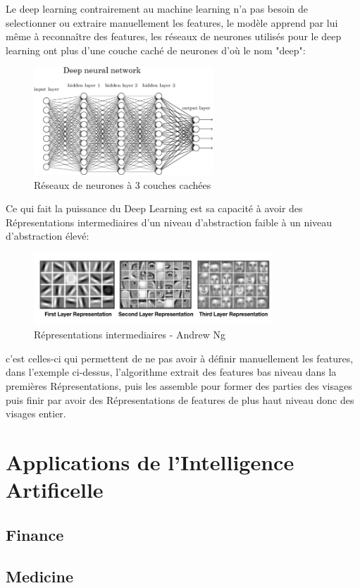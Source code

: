 Le deep learning contrairement au machine learning n'a pas besoin de selectionner 
ou extraire manuellement les features, le modèle apprend par lui même à reconnaître 
des features, les réseaux de neurones utilisés pour le deep learning 
ont plus d'une couche caché de neurones d'où le nom "deep": \newline

\begin{figure}[!h]
    \centering
    \includegraphics[width=0.6\textwidth]{Images/deepnn}
    \caption{Réseaux de neurones à 3 couches cachées}
	\label{fig:deepneuralnetwork}
\end{figure}

Ce qui fait la puissance du Deep Learning est sa capacité à avoir des Répresentations
intermediaires d'un niveau d'abstraction faible à un niveau d'abstraction élevé:

\begin{figure}[!h]
    \centering
    \includegraphics[width=0.8\textwidth]{Images/layeredrepresentation}
    \caption{Répresentations intermediaires - Andrew Ng}
	\label{fig:deepnnrepresentation}
\end{figure}

c'est celles-ci qui permettent de ne pas avoir à définir manuellement les features, 
dans l'exemple ci-dessus, l'algorithme extrait des features bas niveau dans la 
premières Répresentations, puis les assemble pour former des parties des 
visages puis finir par avoir des Répresentations de features de plus 
haut niveau donc des visages entier. \newline


\chapter{Applications de l'Intelligence Artificelle}
\section{Finance}
\section{Medicine}

